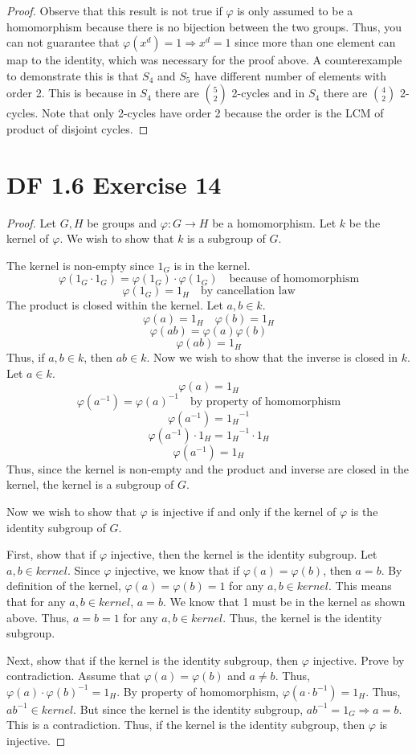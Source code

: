 \documentclass{article}
\begin{document}
\begin{proof}
Observe that this result is not true if $\varphi$ is only assumed to be a homomorphism because there is no bijection between the two groups. Thus, you can not guarantee that $\varphi(x^d) = 1 \Rightarrow x^d = 1$ since more than one element can map to the identity, which was necessary for the proof above. A counterexample to demonstrate this is that $S_4$ and $S_5$ have different number of elements with order 2. This is because in $S_4$ there are ${5 \choose 2}$ 2-cycles and in $S_4$ there are ${4 \choose 2}$ 2-cycles. Note that only 2-cycles have order 2 because the order is the LCM of product of disjoint cycles.
\end{proof}

\section{DF 1.6 Exercise 14}
\begin{proof}
Let $G, H$ be groups and $\varphi: G \rightarrow H$ be a homomorphism. Let $k$ be the kernel of $\varphi$. We wish to show that $k$ is a subgroup of $G$.

The kernel is non-empty since $1_G$ is in the kernel.
\[
\varphi(1_G \cdot 1_G) = \varphi(1_G) \cdot \varphi(1_G) \quad \textrm{because of homomorphism}
\]
\[
\varphi(1_G) = 1_H \quad \textrm{by cancellation law}
\]
The product is closed within the kernel. Let $a, b \in k$.
\[
\varphi(a) = 1_H \quad \varphi(b) = 1_H
\]
\[
\varphi(ab) = \varphi(a)\varphi(b)
\]
\[
\varphi(ab) = 1_H
\]
Thus, if $a, b \in k$, then $ab \in k$. Now we wish to show that the inverse is closed in $k$. Let $a \in k$.
\[
\varphi(a) = 1_H
\]
\[
\varphi(a^{-1}) = \varphi(a)^{-1} \quad \textrm{by property of homomorphism}
\]
\[
\varphi(a^{-1}) = {1_H}^{-1}
\]
\[
\varphi(a^{-1}) \cdot 1_H = {1_H}^{-1} \cdot 1_H
\]
\[
\varphi(a^{-1}) = 1_H
\]
Thus, since the kernel is non-empty and the product and inverse are closed in the kernel, the kernel is a subgroup of $G$.

Now we wish to show that $\varphi$ is injective if and only if the kernel of $\varphi$ is the identity subgroup of $G$. 

First, show that if $\varphi$ injective, then the kernel is the identity subgroup. Let $a,b \in kernel$. Since $\varphi$ injective, we know that if $\varphi(a) = \varphi(b)$, then $a=b$. By definition of the kernel, $\varphi(a) = \varphi(b) = 1$ for any $a, b \in kernel$. This means that for any $a, b \in kernel$, $a = b$. We know that 1 must be in the kernel as shown above. Thus, $a=b=1$ for any $a,b \in kernel$. Thus, the kernel is the identity subgroup.

Next, show that if the kernel is the identity subgroup, then $\varphi$ injective. Prove by contradiction. Assume that $\varphi(a)=\varphi(b)$ and $a \neq b$. Thus, $\varphi(a) \cdot \varphi(b)^{-1} = 1_H$. By property of homomorphism, $\varphi(a \cdot b^{-1}) = 1_H$. Thus, $ab^{-1} \in kernel$. But since the kernel is the identity subgroup, $ab^{-1}=1_G \Rightarrow a=b$. This is a contradiction. Thus, if the kernel is the identity subgroup, then $\varphi$ is injective.
\end{proof}
\end{document}
